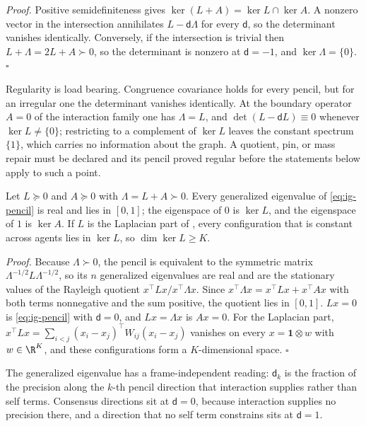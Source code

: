 \noindent\emph{Proof.}
Positive semidefiniteness gives \(\ker(L+A)=\ker L\cap\ker A\). A nonzero vector in
the intersection annihilates \(L-\mathsf d\Lambda\) for every \(\mathsf d\), so the
determinant vanishes identically. Conversely, if the intersection is trivial then
\(L+\Lambda=2L+A\succ0\), so the determinant is nonzero at \(\mathsf d=-1\), and
\(\ker\Lambda=\{0\}\). \hfill$\square$

\medskip
Regularity is load bearing. Congruence covariance holds for every pencil, but for
an irregular one the determinant vanishes identically. At the boundary operator
\(A=0\) of the interaction family one has \(\Lambda=L\), and
\(\det(L-\mathsf dL)\equiv0\) whenever \(\ker L\neq\{0\}\); restricting to a
complement of \(\ker L\) leaves the constant spectrum \(\{1\}\), which carries no
information about the graph. A quotient, pin, or mass repair must be declared and
its pencil proved regular before the statements below apply to such a point.

Let \(L\succeq0\) and \(A\succeq0\) with \(\Lambda=L+A\succ0\). Every generalized
eigenvalue of \eqref{eq:ig-pencil} is real and lies in \([0,1]\); the eigenspace of
\(0\) is \(\ker L\), and the eigenspace of \(1\) is \(\ker A\). If \(L\) is the
Laplacian part of , every configuration that is
constant across agents lies in \(\ker L\), so \(\dim\ker L\geq K\).

\noindent\emph{Proof.}
Because \(\Lambda\succ0\), the pencil is equivalent to the symmetric matrix
\(\Lambda^{-1/2}L\Lambda^{-1/2}\), so its \(n\) generalized eigenvalues are real and
are the stationary values of the Rayleigh quotient
\(x^\top Lx/x^\top\Lambda x\). Since \(x^\top\Lambda x=x^\top Lx+x^\top Ax\) with both
terms nonnegative and the sum positive, the quotient lies in \([0,1]\).
\(Lx=0\) is \eqref{eq:ig-pencil} with \(\mathsf d=0\), and \(Lx=\Lambda x\) is \(Ax=0\).
For the Laplacian part, \(x^\top Lx=\sum_{i<j}(x_i-x_j)^\top W_{ij}(x_i-x_j)\)
vanishes on every \(x=\mathbf 1\otimes w\) with \(w\in\R^K\), and these configurations
form a \(K\)-dimensional space. \hfill$\square$

\medskip
The generalized eigenvalue has a frame-independent reading: \(\mathsf d_k\) is the
fraction of the precision along the \(k\)-th pencil direction that interaction
supplies rather than self terms. Consensus directions sit at \(\mathsf d=0\),
because interaction supplies no precision there, and a direction that no self term
constrains sits at \(\mathsf d=1\).

